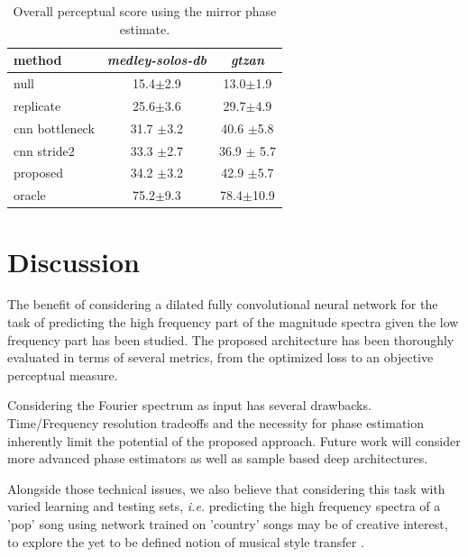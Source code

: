 \documentclass{article}
\newcommand{\fg}[1]{\textcolor{red}{FG : #1}}
\begin{document}
\begin{table}[t]
  \caption{Overall perceptual score using the mirror phase estimate.}
  \label{tab:ops}
\begin{center}
\begin{tabular}{lcc}
method & \textit{medley-solos-db} & \textit{gtzan} \\
\hline
null & 15.4$\pm$2.9 & 13.0$\pm$1.9  \\
replicate & 25.6$\pm$3.6 & 29.7$\pm$4.9 \\
\hline
cnn bottleneck & 31.7 $\pm$3.2 & 40.6 $\pm$5.8 \\
cnn stride2 & 33.3 $\pm$2.7 & 36.9 $\pm$ 5.7 \\
\hline
proposed & 34.2 $\pm$3.2 & 42.9 $\pm$5.7 \\
\hline
oracle  & 75.2$\pm$9.3 & 78.4$\pm$10.9  \\
\end{tabular}
\end{center}
\vspace{-4mm}
\end{table}

\section{Discussion}
\label{sec:discussion}

The benefit of considering a dilated fully convolutional neural network for the task of predicting the high frequency part of the magnitude spectra given the low frequency part has been studied. The proposed architecture has been thoroughly evaluated in terms of several metrics, from the optimized loss to an objective perceptual measure.

Considering the Fourier spectrum as input has several drawbacks. Time/Frequency resolution tradeoffs and the necessity for phase estimation inherently limit the potential of the proposed approach. Future work will consider more advanced phase estimators as well as sample based deep architectures. %




Alongside those technical issues, we also believe that considering this task with varied learning and testing sets, \textit{i.e.} predicting the high frequency spectra of a 'pop' song using network trained on 'country' songs may be of creative interest, to explore the yet to be defined notion of musical style transfer \cite{dai2018music}.


\vfill\pagebreak




\end{document}
